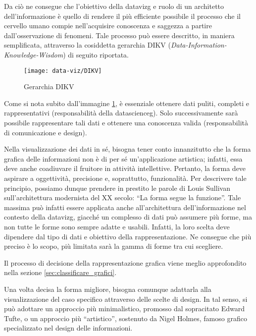 Da ciò ne consegue che l'obiettivo della \gls{datavizg} e ruolo di un architetto dell'informazione è quello di rendere il più efficiente possibile il processo che il cervello
umano compie nell'acquisire conoscenza e saggezza a partire dall'osservazione di fenomeni.
Tale processo può essere descritto, in maniera semplificata, attraverso la cosiddetta gerarchia DIKV (\emph{Data-Information-Knowledge-Wisdom}) di seguito riportata.
\begin{figure}[H] 
    \centering 
    \texttt{[image: data-viz/DIKV]} 
    \caption{Gerarchia DIKV}
    \label{fig:DIKV}
\end{figure}

Come si nota subito dall'immagine \ref{fig:DIKV}, è essenziale ottenere dati puliti, completi e rappresentativi (responsabilità della \gls{datascienceg}). Solo successivamente sarà possibile rappresentare tali dati e 
ottenere una conoscenza valida (responsabilità di comunicazione e design).

\bigskip
\noindent Nella visualizzazione dei dati in sé, bisogna tener conto innanzitutto che la forma grafica delle informazioni non è di per sé un'applicazione artistica; infatti, 
essa deve anche coadiuvare il fruitore in attività intellettive. Pertanto, la forma deve aspirare a oggettività, precisione e, soprattutto, funzionalità.
Per descrivere tale principio, possiamo dunque prendere in prestito le parole di Louis Sullivan sull'architettura modernista del XX secolo: ``La forma segue la funzione''. 
Tale massima può infatti essere applicata anche all'architettura dell'informazione nel contesto della \gls{datavizg}, giacché
un complesso di dati può assumere più forme, ma non tutte le forme sono sempre adatte e usabili. Infatti, la loro scelta deve dipendere dal
tipo di dati e obiettivo della rappresentazione. Ne consegue che più preciso è lo scopo, più limitata sarà la gamma di forme tra cui scegliere.

Il processo di decisione della rappresentazione grafica viene meglio approfondito nella sezione \ref{sec:classificare_grafici}.

\bigskip
\noindent Una volta decisa la forma migliore, bisogna comunque adattarla alla visualizzazione del caso specifico attraverso delle scelte di design.
In tal senso, si può adottare un approccio più minimalistico, promosso dal sopracitato Edward Tufte, o un approccio più ``artistico'', 
sostenuto da Nigel Holmes, famoso grafico specializzato nel design delle informazioni.

